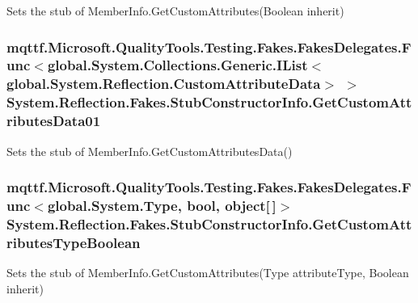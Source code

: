 Sets the stub of Member\-Info.\-Get\-Custom\-Attributes(\-Boolean inherit)

\hypertarget{class_system_1_1_reflection_1_1_fakes_1_1_stub_constructor_info_aa0da5e4f9361370580c3606469288a9d}{
\subsubsection[{Get\-Custom\-Attributes\-Data01}]{\setlength{\rightskip}{0pt plus 5cm}mqttf.\-Microsoft.\-Quality\-Tools.\-Testing.\-Fakes.\-Fakes\-Delegates.\-Func$<$global.\-System.\-Collections.\-Generic.\-I\-List$<$global.\-System.\-Reflection.\-Custom\-Attribute\-Data$>$ $>$ System.\-Reflection.\-Fakes.\-Stub\-Constructor\-Info.\-Get\-Custom\-Attributes\-Data01}}\label{class_system_1_1_reflection_1_1_fakes_1_1_stub_constructor_info_aa0da5e4f9361370580c3606469288a9d}


Sets the stub of Member\-Info.\-Get\-Custom\-Attributes\-Data()

\hypertarget{class_system_1_1_reflection_1_1_fakes_1_1_stub_constructor_info_a14c2def5fac01929b096c0958f9ea3fb}{
\subsubsection[{Get\-Custom\-Attributes\-Type\-Boolean}]{\setlength{\rightskip}{0pt plus 5cm}mqttf.\-Microsoft.\-Quality\-Tools.\-Testing.\-Fakes.\-Fakes\-Delegates.\-Func$<$global.\-System.\-Type, bool, object\mbox{[}$\,$\mbox{]}$>$ System.\-Reflection.\-Fakes.\-Stub\-Constructor\-Info.\-Get\-Custom\-Attributes\-Type\-Boolean}}\label{class_system_1_1_reflection_1_1_fakes_1_1_stub_constructor_info_a14c2def5fac01929b096c0958f9ea3fb}


Sets the stub of Member\-Info.\-Get\-Custom\-Attributes(\-Type attribute\-Type, Boolean inherit)


